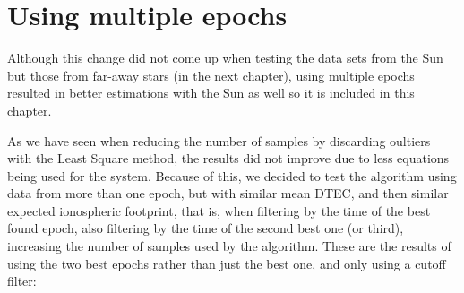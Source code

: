\clearpage

\section{Using multiple epochs}

Although this change did not come up when testing the data sets from the Sun but those from far-away stars (in the next chapter), using multiple epochs resulted in better estimations with the Sun as well so it is included in this chapter.

As we have seen when reducing the number of samples by discarding oultiers with the Least Square method, the results did not improve due to less equations being used for the system. Because of this, we decided to test the algorithm using data from more than one epoch, but with similar mean DTEC, and then similar expected ionospheric footprint, that is, when filtering by the time of the best found epoch, also filtering by the time of the second best one (or third), increasing the number of samples used by the algorithm. These are the results of using the two best epochs rather than just the best one, and only using a cutoff filter:

